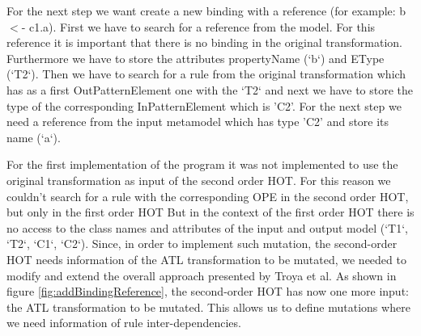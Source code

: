 \documentclass{llncs}
\begin{document}
For the next step we want create a new binding with a reference (for example: b $<$- c1.a).
First we have to search for a reference from the model. For this reference it is
important that there is no binding in the original transformation. Furthermore
we have to store the attributes propertyName (`b`) and EType (`T2`). 
Then we have to search for a rule from the original transformation which
has as a first OutPatternElement one with the `T2` and next we have to store the type of the corresponding InPatternElement which is 'C2'.
For the next step we need a reference from the input metamodel which
has type 'C2' and store its name (`a`). \par

For the first implementation of the program it was not implemented to use the original transformation as input of 
the second order HOT.
For this reason we couldn't search for a rule with the corresponding OPE in the second order HOT, but only in the first order HOT
But in the context of the first order HOT there is no access to the class names and attributes of the
input and output model (`T1`, `T2`, `C1`, `C2`). 
Since, in order to implement such mutation, the second-order HOT needs information of the ATL transformation to be mutated, we needed to modify and extend the overall approach presented by Troya et al. As shown in figure \ref{fig:addBindingReference}, the second-order HOT has now one more input: the ATL transformation to be mutated. This allows us to define mutations where we need information of rule inter-dependencies.
\end{document}
